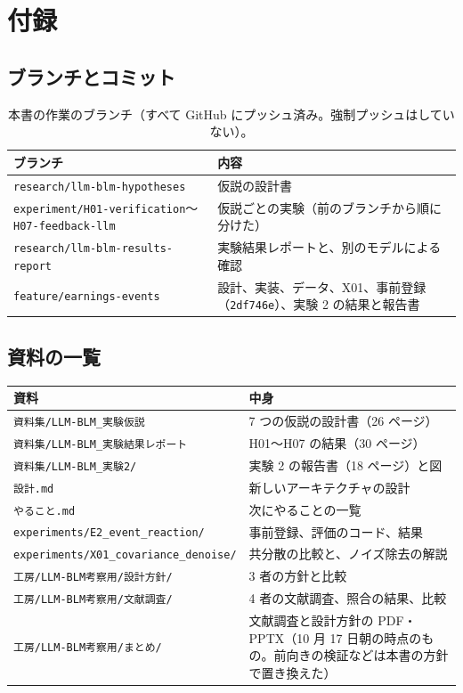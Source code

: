 \documentclass[xelatex,ja=standard,jafont=haranoaji,a4paper,10pt]{bxjsreport}
\newcommand{\code}[1]{\texttt{#1}}
\begin{document}
\part{付録}

\appendix

\chapter{ブランチとコミット}\label{app:git}

\begin{table}[H]
\centering
\caption{本書の作業のブランチ（すべて GitHub にプッシュ済み。強制プッシュはしていない）。}
\small
\begin{tabular}{p{5.6cm}p{8.4cm}}
\toprule
ブランチ & 内容 \\
\midrule
\code{research/llm-blm-hypotheses} & 仮説の設計書 \\
\code{experiment/H01-verification}〜\code{H07-feedback-llm} & 仮説ごとの実験（前のブランチから順に分けた） \\
\code{research/llm-blm-results-report} & 実験結果レポートと、別のモデルによる確認 \\
\code{feature/earnings-events} & 設計、実装、データ、X01、事前登録（\code{2df746e}）、実験 2 の結果と報告書 \\
\bottomrule
\end{tabular}
\end{table}

\chapter{資料の一覧}\label{app:docs}

\begin{longtable}{p{6.4cm}p{7.6cm}}
\toprule
\textbf{資料} & \textbf{中身} \\
\midrule
\endfirsthead
\bottomrule
\endfoot
\code{資料集/LLM-BLM\_実験仮説} & 7 つの仮説の設計書（26 ページ） \\
\code{資料集/LLM-BLM\_実験結果レポート} & H01〜H07 の結果（30 ページ） \\
\code{資料集/LLM-BLM\_実験2/} & 実験 2 の報告書（18 ページ）と図 \\
\code{設計.md} & 新しいアーキテクチャの設計 \\
\code{やること.md} & 次にやることの一覧 \\
\code{experiments/E2\_event\_reaction/} & 事前登録、評価のコード、結果 \\
\code{experiments/X01\_covariance\_}\newline\code{denoise/} & 共分散の比較と、ノイズ除去の解説 \\
\code{工房/LLM-BLM考察用/設計方針/} & 3 者の方針と比較 \\
\code{工房/LLM-BLM考察用/文献調査/} & 4 者の文献調査、照合の結果、比較 \\
\code{工房/LLM-BLM考察用/まとめ/} & 文献調査と設計方針の PDF・PPTX（10 月 17 日朝の時点のもの。前向きの検証などは本書の方針で置き換えた） \\
\end{longtable}
\end{document}
